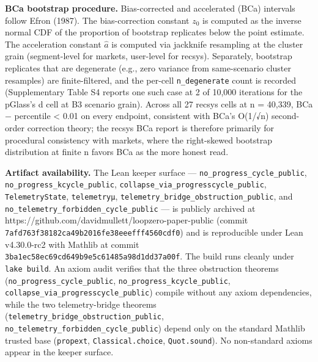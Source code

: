 \documentclass[
  11pt,
]{article}
\begin{document}
\textbf{BCa bootstrap procedure.} Bias-corrected and accelerated (BCa)
intervals follow Efron (1987). The bias-correction constant \(z_0\) is
computed as the inverse normal CDF of the proportion of bootstrap
replicates below the point estimate. The acceleration constant
\(\hat a\) is computed via jackknife resampling at the cluster grain
(segment-level for markets, user-level for recsys). Separately,
bootstrap replicates that are degenerate (e.g., zero variance from
same-scenario cluster resamples) are finite-filtered, and the per-cell
\texttt{n\_degenerate} count is recorded (Supplementary Table S4 reports
one such case at 2 of 10,000 iterations for the p\textbar Glass's d cell
at B3 scenario grain). Across all 27 recsys cells at n = 40,339,
\textbar BCa − percentile\textbar{} \textless{} 0.01 on every endpoint,
consistent with BCa's O(1/√n) second-order correction theory; the recsys
BCa report is therefore primarily for procedural consistency with
markets, where the right-skewed bootstrap distribution at finite n
favors BCa as the more honest read.

\textbf{Artifact availability.} The Lean keeper surface ---
\texttt{no\_progress\_cycle\_public},
\texttt{no\_progress\_kcycle\_public},
\texttt{collapse\_via\_progresscycle\_public}, \texttt{TelemetryState},
\texttt{telemetryμ}, \texttt{telemetry\_bridge\_obstruction\_public},
and \texttt{no\_telemetry\_forbidden\_cycle\_public} --- is publicly
archived at https://github.com/davidmullett/loopzero-paper-public
(commit \texttt{7afd763f38182ca49b2016fe38eeefff4560cdf0}) and is
reproducible under Lean v4.30.0-rc2 with Mathlib at commit
\texttt{3ba1ec58ec69cd649b9e5c61485a98d1dd37a00f}. The build runs
cleanly under \texttt{lake\ build}. An axiom audit verifies that the
three obstruction theorems (\texttt{no\_progress\_cycle\_public},
\texttt{no\_progress\_kcycle\_public},
\texttt{collapse\_via\_progresscycle\_public}) compile without any axiom
dependencies, while the two telemetry-bridge theorems
(\texttt{telemetry\_bridge\_obstruction\_public},
\texttt{no\_telemetry\_forbidden\_cycle\_public}) depend only on the
standard Mathlib trusted base (\texttt{propext},
\texttt{Classical.choice}, \texttt{Quot.sound}). No non-standard axioms
appear in the keeper surface.
\end{document}
